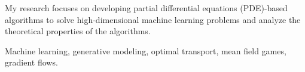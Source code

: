 

\begin{cvparagraph}


My research focuses on developing partial differential equations (PDE)-based algorithms to solve high-dimensional machine learning problems and analyze the theoretical properties of the algorithms.

Machine learning, generative modeling, optimal transport, mean field games, gradient flows.

\end{cvparagraph}